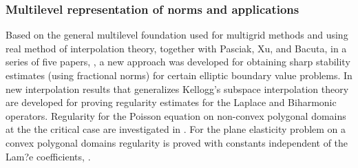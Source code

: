 \documentclass[CJK,11pt]{amsart}
\theoremstyle{definition}
\begin{document}
\begin{CJK*}{UTF8}{gbsn}
\subsubsection{Multilevel representation of norms and applications}
Based on the general multilevel foundation used for multigrid methods
and using real method of interpolation theory, together with Pasciak,
Xu, and Bacuta, in a series of five papers,
\cite{bacuta2002shift, bacuta2003using, bacuta2003regularity-c, bacuta2003regularity-a, bacuta2003regularity-b}, a
new approach was developed for obtaining sharp stability estimates
(using fractional norms) for certain elliptic boundary value
problems. In \cite{bacuta2002shift, bacuta2003using}
new interpolation results that generalizes Kellogg's subspace
interpolation theory are developed for proving regularity estimates
for the Laplace and Biharmonic operators. Regularity for the Poisson
equation on non-convex polygonal domains at the the critical case are
investigated in \cite{bacuta2003regularity-c, bacuta2003regularity-a}.
For the plane elasticity problem on a convex polygonal domains
regularity is proved with constants independent of the Lam?e
coefficients, \cite{bacuta2003regularity-b}.

 



\end{CJK*}
\end{document}
